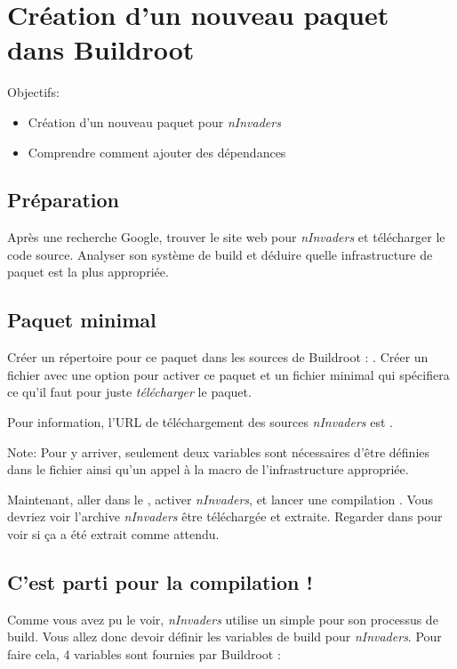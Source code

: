 \chapter
{Création d'un nouveau paquet dans Buildroot}
{Objectifs:
  \begin{itemize}
  \item Création d'un nouveau paquet pour {\em nInvaders}
  \item Comprendre comment ajouter des dépendances
  \end{itemize}
}

\section{Préparation}

Après une recherche Google, trouver le site web pour {\em nInvaders}
et télécharger le code source. Analyser son système de build et
déduire quelle infrastructure de paquet est la plus appropriée.

\section{Paquet minimal}

Créer un répertoire pour ce paquet dans les sources de Buildroot :
. Créer un fichier  avec une option
pour activer ce paquet et un fichier  minimal qui spécifiera
ce qu'il faut pour juste {\em télécharger} le paquet.

Pour information, l'URL de téléchargement des sources {\em nInvaders} est
.

Note: Pour y arriver, seulement deux variables sont nécessaires d'être définies
dans le fichier  ainsi qu'un appel à la macro de l'infrastructure
appropriée.

Maintenant, aller dans le , activer {\em nInvaders}, et lancer
une compilation . Vous devriez voir l'archive {\em nInvaders}
être téléchargée et extraite. Regarder dans  pour voir
si ça a été extrait comme attendu.

\section{C'est parti pour la compilation !}

Comme vous avez pu le voir, {\em nInvaders} utilise un simple 
pour son processus de build. Vous allez donc devoir définir les variables
de build pour {\em nInvaders}. Pour faire cela, 4 variables sont fournies par
Buildroot :

